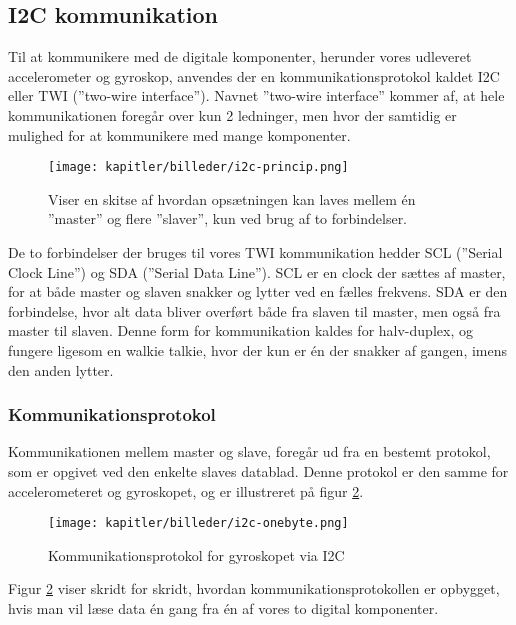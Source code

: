 \newpage

\subsection{I2C kommunikation}
Til at kommunikere med de digitale komponenter, herunder vores udleveret accelerometer og gyroskop, anvendes der en kommunikationsprotokol kaldet I2C eller TWI (”two-wire interface”). Navnet ”two-wire interface” kommer af, at hele kommunikationen foregår over kun 2 ledninger, men hvor der samtidig er mulighed for at kommunikere med mange komponenter.

\begin{figure}[ht]
    \centering
    \texttt{[image: kapitler/billeder/i2c-princip.png]}
    \caption{Viser en skitse af hvordan opsætningen kan laves mellem
én ”master” og flere ”slaver”, kun ved brug af to forbindelser.}
    \label{fig:i2cprincip}
\end{figure}


De to forbindelser der bruges til vores TWI kommunikation hedder SCL (”Serial Clock Line”) og SDA (”Serial Data Line”). SCL er en clock der sættes af master, for at både master og slaven snakker og lytter ved en fælles frekvens. SDA er den forbindelse, hvor alt data bliver overført både fra slaven til master, men også fra master til slaven. Denne form for kommunikation kaldes for halv-duplex, og fungere ligesom en walkie talkie, hvor der kun er én der snakker af gangen, imens den anden lytter.

\subsubsection{Kommunikationsprotokol}

Kommunikationen mellem master og slave, foregår ud fra en bestemt protokol, som er opgivet ved den enkelte slaves datablad. Denne protokol er den samme for accelerometeret og gyroskopet, og er illustreret på figur \ref{fig:i2conebyte}.

\begin{figure}[ht]
    \centering
    \texttt{[image: kapitler/billeder/i2c-onebyte.png]}
    \caption{Kommunikationsprotokol for gyroskopet via I2C}
    \label{fig:i2conebyte}
\end{figure}

Figur \ref{fig:i2conebyte} viser skridt for skridt, hvordan kommunikationsprotokollen er opbygget, hvis man vil læse data én gang fra én af vores to digital komponenter.

